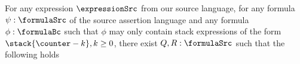 \begin{exprValueOnStack} \label{exprValueOnStack}
For any expression $\expressionSrc$ from our source language, for any formula $\psi: \formulaSrc$  
of the source assertion language and any formula $\phi: \formulaBc$ such that $\phi$ may only 
contain stack expressions of the form     $\stack{\counter - k}, k \ge 0$, there 
exist $ Q, R : \formulaSrc$ such that the following holds


\end{exprValueOnStack}
